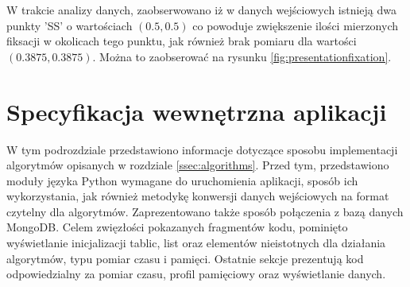 W trakcie analizy danych, zaobserwowano iż w danych wejściowych istnieją dwa punkty 'SS' o wartościach $(0.5,0.5)$ co powoduje zwiększenie ilości mierzonych fiksacji w okolicach tego punktu, jak również brak pomiaru dla wartości $(0.3875,0.3875)$. Można to zaobserować na rysunku \ref{fig:presentationfixation}.
\section{Specyfikacja wewnętrzna aplikacji}
\label{sec:internal}
W tym podrozdziale przedstawiono informacje dotyczące sposobu implementacji algorytmów opisanych w rozdziale \ref{ssec:algorithms}. Przed tym, przedstawiono moduły języka Python wymagane do uruchomienia aplikacji, sposób ich wykorzystania, jak również metodykę konwersji danych wejściowych na format czytelny dla algorytmów. Zaprezentowano także sposób połączenia z bazą danych MongoDB. Celem zwięzłości pokazanych fragmentów kodu, pominięto wyświetlanie inicjalizacji tablic, list oraz elementów nieistotnych dla działania algorytmów, typu pomiar czasu i pamięci. Ostatnie sekcje prezentują kod odpowiedzialny za pomiar czasu, profil pamięciowy oraz wyświetlanie danych.
